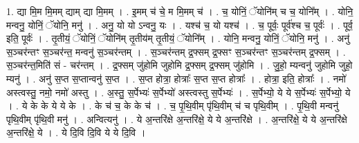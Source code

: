 \documentclass[17pt]{extarticle}
\begin{document}
1. द्या मि॒म मि॒मम् द्याम् द्या मि॒मम् । . इ॒मम् च॑ चे॒ म मि॒मम् च॑ । . च॒ योनिं॒ ॅयोनि॑म् च च॒ योनि᳚म् । . योनि॒ मन्वनु॒ योनिं॒ ॅयोनि॒ मनु॑ । . अनु॒ यो यो ऽन्वनु॒ यः । . यश्च॑ च॒ यो यश्च॑ । . च॒ पूर्वः॒ पूर्व॑श्च च॒ पूर्वः॑ । . पूर्व॒ इति॒ पूर्वः॑ । . तृ॒तीयं॒ ॅयोनिं॒ ॅयोनि॑म् तृ॒तीय॑म् तृ॒तीयं॒ ॅयोनि᳚म् । . योनि॒ मन्वनु॒ योनिं॒ ॅयोनि॒ मनु॑ । . अनु॑ स॒ञ्चर॑न्तꣳ स॒ञ्चर॑न्त॒ मन्वनु॑ स॒ञ्चर॑न्तम् । . स॒ञ्चर॑न्तम् द्र॒फ्सम् द्र॒फ्सꣳ स॒ञ्चर॑न्तꣳ स॒ञ्चर॑न्तम् द्र॒फ्सम् । . स॒ञ्चर॑न्त॒मिति॑ सं - चर॑न्तम् । . द्र॒फ्सम् जु॑होमि जुहोमि द्र॒फ्सम् द्र॒फ्सम् जु॑होमि । . जु॒हो॒ म्यन्वनु॑ जुहोमि जुहो॒ म्यनु॑ । . अनु॑ स॒प्त स॒प्तान्वनु॑ स॒प्त । . स॒प्त होत्रा॒ होत्राः᳚ स॒प्त स॒प्त होत्राः᳚ । . होत्रा॒ इति॒ होत्राः᳚ । . नमो॑ अस्त्वस्तु॒ नमो॒ नमो॑ अस्तु । . अ॒स्तु॒ स॒र्पेभ्यः॑ स॒र्पेभ्यो॑ अस्त्वस्तु स॒र्पेभ्यः॑ । . स॒र्पेभ्यो॒ ये ये स॒र्पेभ्यः॑ स॒र्पेभ्यो॒ ये । . ये के के ये ये के । . के च॑ च॒ के के च॑ । . च॒ पृ॒थि॒वीम् पृ॑थि॒वीम् च॑ च पृथि॒वीम् । . पृ॒थि॒वी मन्वनु॑ पृथि॒वीम् पृ॑थि॒वी मनु॑ । . अन्वित्यनु॑ । . ये अ॒न्तरि॑क्षे अ॒न्तरि॑क्षे॒ ये ये अ॒न्तरि॑क्षे । . अ॒न्तरि॑क्षे॒ ये ये अ॒न्तरि॑क्षे अ॒न्तरि॑क्षे॒ ये । . ये दि॒वि दि॒वि ये ये दि॒वि । \newline
\end{document}
